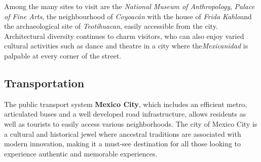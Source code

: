 \documentclass[12pt, a4paper]{article}
\begin{document}
Among the many sites to visit are the \textit{National Museum of Anthropology}, \textit{Palace of Fine Arts}, the neighbourhood of \textit{Coyoacán} with the house of \textit{Frida Kahlo}and the archaeological site of \textit{Teotihuacan}, easily accessible from the city. Architectural diversity continues to charm visitors, who can also enjoy varied cultural activities such as dance and theatre in a city where the\textit{Mexicanidad} is palpable at every corner of the street. \subsection*{\textbf{Transportation}} The public transport system \textbf{Mexico City}, which includes an efficient metro, articulated buses and a well developed road infrastructure, allows residents as well as tourists to easily access various neighborhoods. The city of Mexico City is a cultural and historical jewel where ancestral traditions are associated with modern innovation, making it a must-see destination for all those looking to experience authentic and memorable experiences.
\end{document}
